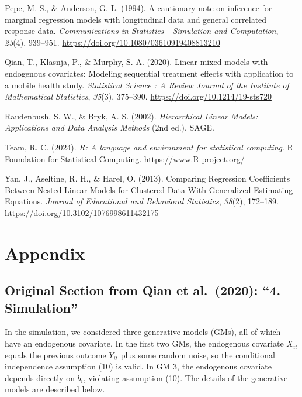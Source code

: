 \documentclass[
  12pt,
  a4paper,
]{article}
\newlength{\cslhangindent}
\newenvironment{CSLReferences}[2] %
 {\begin{list}{}{%
  \setlength{\itemindent}{0pt}
  \setlength{\leftmargin}{0pt}
  \setlength{\parsep}{0pt}
  \ifodd #1
   \setlength{\leftmargin}{\cslhangindent}
   \setlength{\itemindent}{-1\cslhangindent}
  \fi
  \setlength{\itemsep}{#2\baselineskip}}}
 {\end{list}}
\begin{document}
\begin{CSLReferences}{1}{0}
Pepe, M. S., \& Anderson, G. L. (1994). A cautionary note on inference
for marginal regression models with longitudinal data and general
correlated response data. \emph{Communications in Statistics -
Simulation and Computation}, \emph{23}(4), 939--951.
\url{https://doi.org/10.1080/03610919408813210}

Qian, T., Klasnja, P., \& Murphy, S. A. (2020). Linear mixed models with
endogenous covariates: Modeling sequential treatment effects with
application to a mobile health study. \emph{Statistical Science : A
Review Journal of the Institute of Mathematical Statistics},
\emph{35}(3), 375--390. \url{https://doi.org/10.1214/19-sts720}

Raudenbush, S. W., \& Bryk, A. S. (2002). \emph{Hierarchical Linear
Models: Applications and Data Analysis Methods} (2nd ed.). SAGE.

Team, R. C. (2024). \emph{R: A language and environment for statistical
computing}. R Foundation for Statistical Computing.
\url{https://www.R-project.org/}

Yan, J., Aseltine, R. H., \& Harel, O. (2013). Comparing Regression
Coefficients Between Nested Linear Models for Clustered Data With
Generalized Estimating Equations. \emph{Journal of Educational and
Behavioral Statistics}, \emph{38}(2), 172--189.
\url{https://doi.org/10.3102/1076998611432175}

\end{CSLReferences}

\section{Appendix}\label{appendix}

\subsection{Original Section from Qian et al.~(2020): ``4.
Simulation''}\label{original-section-from-qian-et-al.-2020-4.-simulation}

In the simulation, we considered three generative models (GMs), all of
which have an endogenous covariate. In the first two GMs, the endogenous
covariate \(X_{it}\) equals the previous outcome \(Y_{it}\) plus some
random noise, so the conditional independence assumption (10) is valid.
In GM 3, the endogenous covariate depends directly on \(b_i\), violating
assumption (10). The details of the generative models are described
below.
\end{document}

